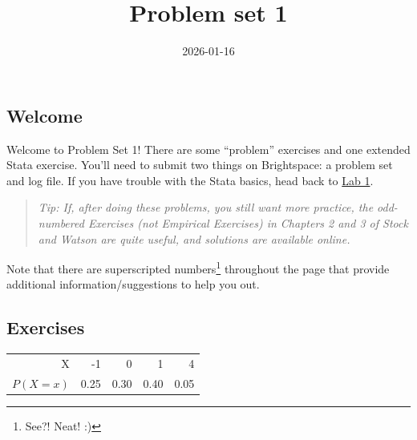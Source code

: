 \documentclass[
]{article}
\title{Problem set 1}
\author{}
\date{2026-01-16}
\begin{document}
\maketitle

\subsection{Welcome}\label{welcome}

Welcome to Problem Set 1! There are some ``problem'' exercises and one
extended Stata exercise. You'll need to submit two things on
Brightspace: a problem set and log file. If you have trouble with the
Stata basics, head back to \href{../01-lab/}{Lab 1}.

\begin{quote}
\emph{Tip: If, after doing these problems, you still want more practice,
the odd-numbered Exercises (not Empirical Exercises) in Chapters 2 and 3
of Stock and Watson are quite useful, and solutions are available
online.}
\end{quote}

Note that there are superscripted numbers\footnote{See?! Neat! :)}
throughout the page that provide additional information/suggestions to
help you out.

\subsection{Exercises}\label{exercises}

{\def\LTcaptype{} %
\begin{longtable}[]{@{}rrrrr@{}}
\toprule\noalign{}
\endhead
\bottomrule\noalign{}
\endlastfoot
X & -1 & 0 & 1 & 4 \\
\(P(X=x)\) & 0.25 & 0.30 & 0.40 & 0.05 \\
\end{longtable}
}
\end{document}
